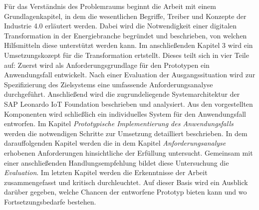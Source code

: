 Für das Verständnis des Problemraums beginnt die Arbeit mit einem Grundlagenkapitel, in dem die wesentlichen Begriffe, Treiber und Konzepte der Industrie 4.0 erläutert werden. Dabei wird die Notwendigkeit einer digitalen Transformation in der Energiebranche begründet und beschrieben, von welchen  Hilfsmitteln diese unterstützt werden kann. Im anschließenden Kapitel 3 wird ein Umsetzungskozept für die Transformation ertstellt. Dieses teilt sich in vier Teile auf: Zuerst wird als Anforderungsgrundlage für den Prototypen ein Anwendungsfall entwickelt. Nach einer Evaluation der Ausgangssituation wird zur Spezifizierung des Zielsystems eine umfassende Anforderungsanalyse durchgeführt. Anschließend wird die zugrundeliegende Systemarchitektur der SAP Leonardo IoT Foundation beschrieben und analysiert. Aus den vorgestellten Komponenten wird schließlich ein individuelles System für den Anwendungsfall entworfen. Im Kapitel \textit{Prototypische Implementierung des Anwendungsfalls} werden die notwendigen Schritte zur Umsetzung detailliert beschrieben. In dem darauffolgenden Kapitel werden die in dem Kapitel \textit{Anforderungsanalyse} erhobenen Anforderungen hinsichtliche der Erfüllung untersucht. Gemeinsam mit einer anschließenden Handlungsempfehlung bildet diese Untersuchung die \textit{Evaluation}. Im letzten Kapitel werden die Erkenntnisse der Arbeit zusammengefasst und kritisch durchleuchtet. Auf dieser Basis wird ein Ausblick darüber gegeben, welche Chancen der entworfene Prototyp bieten kann und wo Fortsetzungsbedarfe bestehen. 


\newpage
